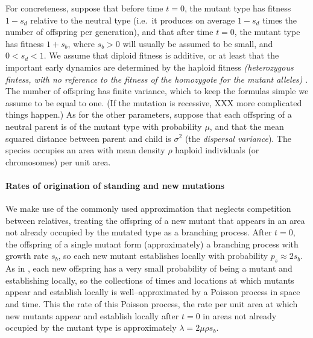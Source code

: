 \documentclass{article}
\newcommand{\gc}[1]{{\it\color{green}(#1)} }
\begin{document}
For concreteness, suppose that before time $t=0$,
the mutant type has fitness $1-s_d$ relative to the neutral type
(i.e.\ it produces on average $1-s_d$ times the number of offspring per generation),
and that after time $t=0$,
the mutant type has fitness $1+s_b$,
where $s_b>0$ will usually be assumed to be small, and $0<s_d<1$.
We assume that diploid fitness is additive, or at least that the
important early dynamics are determined by the haploid fitness
\gc{heterozygous fintess, with no reference to the fitness of the
  homozygote for the mutant alleles}.
The number of offspring has finite variance, which to keep the formulas simple we assume to be equal to one.
(If the mutation is recessive, XXX more complicated things happen.)
As for the other parameters,
suppose that each offspring of a neutral parent is of the mutant type with probability $\mu$,
and that the mean squared distance between parent and child is $\sigma^2$ (the {\em dispersal variance}).
The species occupies an area with mean density
$\rho$ haploid individuals (or chromosomes) per unit area.


\paragraph{Rates of origination of standing and new mutations}
We make use of the commonly used approximation that neglects competition between relatives,
treating the offspring of a new mutant that appears in an area not already occupied by the mutated type
as a branching process.
After $t=0$, the offspring of a single mutant form (approximately) a branching process with growth rate $s_b$,
so each new mutant establishes locally with probability $p_s \approx 2s_b$.
As in \cite{ralphcoop2010}, each new offspring has a very small probability of being a mutant and establishing locally,
so the collections of times and locations at which mutants appear and establish locally 
is well--approximated by a Poisson process in space and time.
This the rate of this Poisson process, 
the rate per unit area at which new mutants appear and establish locally after $t=0$ in areas not already occupied by the mutant type
is approximately $\lambda = 2 \mu \rho s_b$.
\end{document}
